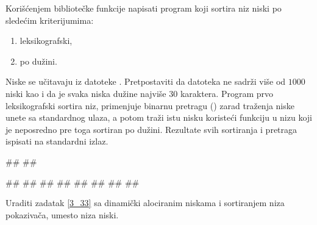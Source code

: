 \begin{Answer}[ref=3_32]
\end{Answer}
\begin{Exercise}[label=3_33]
   Korišćenjem bibliotečke funkcije  napisati program
   koji sortira niz niski po sledećim kriterijumima:
   \begin{enumerate}
   \item leksikografski,
   \item po dužini.
   \end{enumerate}
   Niske se učitavaju iz datoteke . Pretpostaviti da datoteka ne sadrži više od 
   $1000$ niski kao i da je svaka niska dužine najviše $30$ karaktera. Program prvo
   leksikografski sortira niz, primenjuje binarnu pretragu
   () zarad traženja niske unete sa standardnog ulaza,
   a potom traži istu nisku koristeći funkciju  u nizu koji je neposredno pre toga
   sortiran po dužini. Rezultate svih sortiranja
   i pretraga ispisati na standardni izlaz.

   
\begin{maxitest}
\begin{upotreba}{1}
##
##
  
#\naslovInt#
##
##
##
##
##
##
##
\end{upotreba}
\end{maxitest}
  
\end{Exercise}

\begin{Answer}[ref=3_33]
\end{Answer}
\begin{Exercise}[label=3_34]
  Uraditi zadatak \ref{3_33} sa dinamički alociranim niskama
  i sortiranjem niza pokazivača, umesto niza niski.
  
\end{Exercise}

